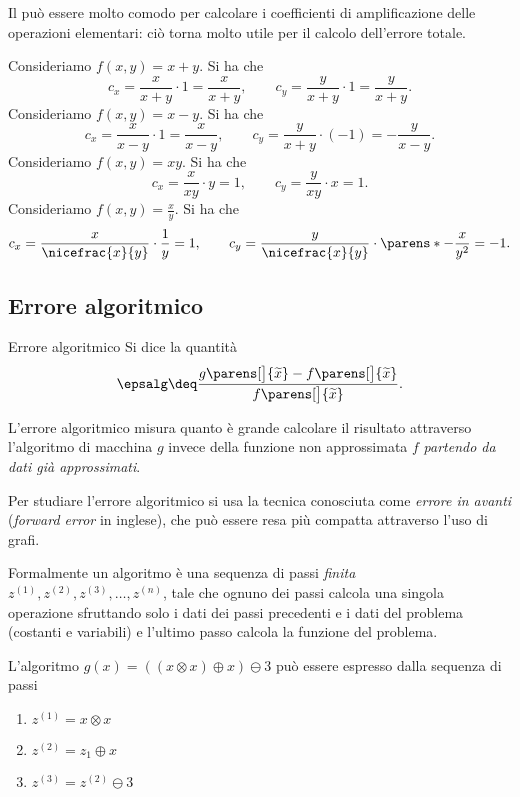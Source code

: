 Il  può essere molto comodo per calcolare i coefficienti di amplificazione delle operazioni elementari: ciò torna molto utile per il calcolo dell'errore totale.

 Consideriamo $f(x, y) = x + y$. Si ha che \[
    c_x = \frac{x}{x+y}\cdot 1 = \frac{x}{x+y}, \qquad c_y = \frac{y}{x+y} \cdot 1 = \frac{y}{x+y}.
\] 
 Consideriamo $f(x, y) = x - y$. Si ha che \[
    c_x = \frac{x}{x-y}\cdot 1 = \frac{x}{x-y}, \qquad c_y = \frac{y}{x+y} \cdot (-1) = -\frac{y}{x-y}.
\] 
 Consideriamo $f(x, y) = xy$. Si ha che \[
    c_x = \frac{x}{xy}\cdot y = 1, \qquad c_y = \frac{y}{xy} \cdot x = 1.
\] 
 Consideriamo $f(x, y) = \frac{x}{y}$. Si ha che \[
    c_x = \frac{x}{\nicefrac{x}{y}} \cdot \frac{1}{y} = 1, \qquad c_y = \frac{y}{\nicefrac{x}{y}} \cdot \parens*{-\frac{x}{y^2}} = -1.
\] 

\subsection{Errore algoritmico}

\begin{definition}{Errore algoritmico}{}
    Si dice  la quantità \[
        \epsalg \deq \frac{g\parens[\big]{\tilde x} - f\parens[\big]{\tilde x}}{f\parens[\big]{\tilde x}}.
    \]
\end{definition}

L'errore algoritmico misura quanto è grande calcolare il risultato attraverso l'algoritmo di macchina $g$ invece della funzione non approssimata $f$ \emph{partendo da dati già approssimati}.

Per studiare l'errore algoritmico si usa la tecnica conosciuta come \emph{errore in avanti} (\emph{forward error} in inglese), che può essere resa più compatta attraverso l'uso di grafi.

Formalmente un algoritmo è una sequenza di passi \emph{finita} $z^{(1)}, z^{(2)}, z^{(3)}, \dots, z^{(n)}$, tale che ognuno dei passi calcola una singola operazione sfruttando solo i dati dei passi precedenti e i dati del problema (costanti e variabili) e l'ultimo passo calcola la funzione del problema.

\begin{example}
    L'algoritmo $g(x) = ((x \otimes x) \oplus x) \ominus 3$ può essere espresso dalla sequenza di passi \begin{enumerate}
        \item $z^{(1)} = x \otimes x$ 
        \item $z^{(2)} = z_1 \oplus x$
        \item $z^{(3)} = z^{(2)} \ominus 3$
    \end{enumerate} 
\end{example}

